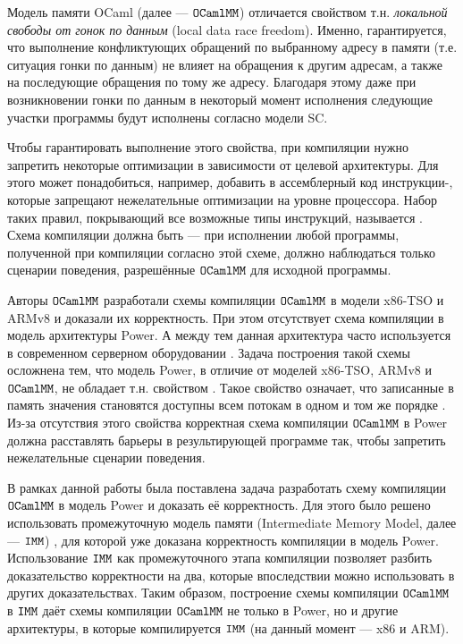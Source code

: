 Модель памяти OCaml \cite{omm} (далее --- $\mathtt{OCaml}\allowbreak \mathtt{MM}$) отличается свойством т.н.  \textit{локальной свободы от гонок по данным} (local data race freedom). Именно, гарантируется, что выполнение конфликтующих обращений по выбранному адресу в памяти (т.е. ситуация гонки по данным) не влияет на обращения к другим адресам, а также на последующие обращения по тому же адресу. Благодаря этому даже при возникновении гонки по данным в некоторый момент исполнения следующие участки программы будут исполнены согласно модели SC. 

Чтобы гарантировать выполнение этого свойства, при компиляции нужно запретить некоторые оптимизации в зависимости от целевой архитектуры.
Для этого может понадобиться, например, добавить в ассемблерный код инструкции-, которые запрещают нежелательные оптимизации на уровне процессора. 
Набор таких правил, покрывающий все возможные типы инструкций, называется . Схема компиляции должна быть  --- при исполнении любой программы, полученной при компиляции согласно этой схеме, должно наблюдаться только сценарии поведения, разрешённые $\mathtt{OCaml}\allowbreak \mathtt{MM}$ для исходной программы.

Авторы $\mathtt{OCaml}\allowbreak \mathtt{MM}$ разработали схемы компиляции $\mathtt{OCaml}\allowbreak \mathtt{MM}$ в модели x86-TSO и ARMv8 \cite{omm} и доказали их корректность. При этом отсутствует схема компиляции в модель архитектуры Power. А между тем данная архитектура часто используется в современном серверном оборудовании \cite{power-servers}. Задача построения такой схемы осложнена тем, что модель Power, в отличие от моделей x86-TSO, ARMv8 и $\mathtt{OCaml}\allowbreak \mathtt{MM}$, не обладает т.н. свойством . Такое свойство означает, что записанные в память значения становятся доступны всем потокам в одном и том же порядке \cite{arm}. Из-за отсутствия этого свойства корректная схема компиляции $\mathtt{OCaml}\allowbreak \mathtt{MM}$ в Power должна расставлять барьеры в результирующей программе так, чтобы запретить нежелательные сценарии поведения. 

В рамках данной работы была поставлена задача разработать схему компиляции $\mathtt{OCaml}\allowbreak \mathtt{MM}$ в модель Power и доказать её корректность. Для этого было решено использовать промежуточную модель памяти (Intermediate Memory Model, далее — $\mathtt{IMM}$) \cite{imm}, для которой уже доказана корректность компиляции в модель Power. Использование $\mathtt{IMM}$ как промежуточного этапа компиляции позволяет разбить доказательство корректности  на два, которые впоследствии можно использовать в других доказательствах. Таким образом, построение схемы компиляции $\mathtt{OCaml}\allowbreak \mathtt{MM}$ в $\mathtt{IMM}$ даёт схемы компиляции $\mathtt{OCaml}\allowbreak \mathtt{MM}$ не только в Power, но и другие архитектуры, в которые компилируется $\mathtt{IMM}$ (на данный момент --- x86 и ARM). 


